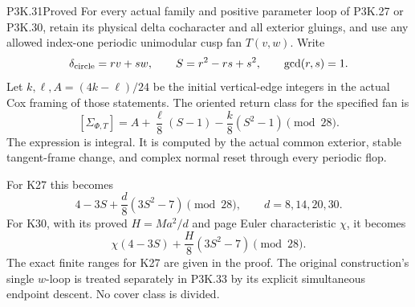 \begin{statement}{P3K.31}{Proved}
For every actual family and positive parameter loop of P3K.27 or
P3K.30, retain its physical delta cocharacter and all exterior
gluings, and use any allowed index-one periodic unimodular cusp
fan \(T(v,w)\). Write
\[
 \delta_{\rm circle}=r v+s w,\qquad
 S=r^2-rs+s^2,\qquad \gcd(r,s)=1.
\]
Let \(k,\ell,A=(4k-\ell)/24\) be the initial vertical-edge
integers in the actual Cox framing of those statements.
The oriented return class for the specified fan is
\[
 [\Sigma_{\Phi,T}]
    =A+\frac{\ell}{8}(S-1)-\frac{k}{8}(S^2-1)
        \pmod{28}.                                      \tag{P3K.31.0}
\]
The expression is integral. It is computed by the actual common
exterior, stable tangent-frame change, and complex normal reset
through every periodic flop.

For K27 this becomes
\[
           4-3S+\frac d8(3S^2-7)\pmod{28},
       \qquad d=8,14,20,30.
\]
For K30, with its proved \(H=Ma^2/d\) and page Euler characteristic
\(\chi\), it becomes
\[
                 \chi(4-3S)+\frac H8(3S^2-7)\pmod{28}.
\]
The exact finite ranges for K27 are given in the proof.
 The original construction's single \(w\)-loop is treated separately
 in P3K.33 by its explicit simultaneous endpoint descent. No cover
 class is divided.
\end{statement}
